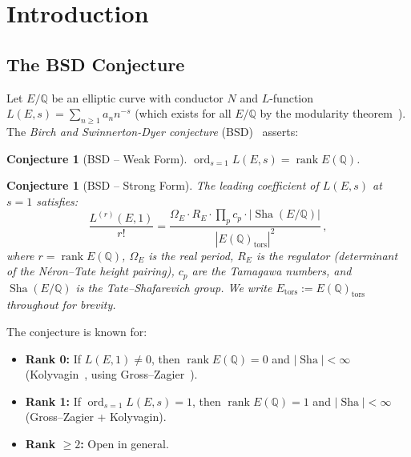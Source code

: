 \documentclass[aps,prd,twocolumn,superscriptaddress,nofootinbib,floatfix]{revtex4-2}
\newtheorem{conjecture}[theorem]{Conjecture}
\theoremstyle{definition}
\theoremstyle{remark}
\DeclareMathOperator{\ord}{ord}
\DeclareMathOperator{\rank}{rank}
\DeclareMathOperator{\Sha}{Sha}
\begin{document}
\section{Introduction}
\label{sec:intro}

\subsection{The BSD Conjecture}

Let $E/\mathbb{Q}$ be an elliptic curve with conductor $N$ and $L$-function $L(E,s) = \sum_{n \geq 1} a_n n^{-s}$ (which exists for all $E/\mathbb{Q}$ by the modularity theorem~\cite{Wiles1995}). The \textit{Birch and Swinnerton-Dyer conjecture} (BSD)~\cite{BSD1965} asserts:

\begin{conjecture}[BSD -- Weak Form]
\label{conj:bsd_weak}
$\ord_{s=1} L(E,s) = \rank E(\mathbb{Q})$.
\end{conjecture}

\begin{conjecture}[BSD -- Strong Form]
\label{conj:bsd_strong}
The leading coefficient of $L(E,s)$ at $s = 1$ satisfies:
\begin{equation}
\frac{L^{(r)}(E,1)}{r!} = \frac{\Omega_E \cdot R_E \cdot \prod_p c_p \cdot |\Sha(E/\mathbb{Q})|}{|E(\mathbb{Q})_{\mathrm{tors}}|^2}\,,
\label{eq:bsd_formula}
\end{equation}
where $r = \rank E(\mathbb{Q})$, $\Omega_E$ is the real period, $R_E$ is the regulator (determinant of the Néron--Tate height pairing), $c_p$ are the Tamagawa numbers, and $\Sha(E/\mathbb{Q})$ is the Tate--Shafarevich group. We write $E_{\mathrm{tors}} := E(\mathbb{Q})_{\mathrm{tors}}$ throughout for brevity.
\end{conjecture}

The conjecture is known for:
\begin{itemize}
\item \textbf{Rank 0:} If $L(E,1) \neq 0$, then $\rank E(\mathbb{Q}) = 0$ and $|\Sha| < \infty$ (Kolyvagin~\cite{Kolyvagin1990}, using Gross--Zagier~\cite{GrossZagier1986}).
\item \textbf{Rank 1:} If $\ord_{s=1} L(E,s) = 1$, then $\rank E(\mathbb{Q}) = 1$ and $|\Sha| < \infty$ (Gross--Zagier + Kolyvagin).
\item \textbf{Rank $\geq 2$:} Open in general.
\end{itemize}
\end{document}
